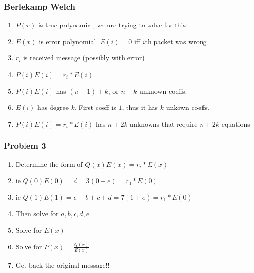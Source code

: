 \documentclass{beamer}
\begin{document}
\begin{frame}
  \frametitle{Berlekamp Welch}

    \begin{enumerate}[<+->]
      \item $P(x)$ is true polynomial, we are trying to solve for this
      \item $E(x)$ is error polynomial. $E(i) = 0$ iff $i$th packet was wrong
      \item $r_i$ is received message (possibly with error)
      \item $P(i)E(i) = r_i * E(i)$
      \item $P(i)E(i)$ has $(n - 1) + k$, or $n+k$ unknown coeffs. 
      \item $E(i)$ has degree $k$. First coeff is $1$, thus it has $k$ unkown coeffs.
      \item $P(i)E(i) = r_i * E(i)$ has $n + 2k$ unknowns that require $n+2k$ equations
    \end{enumerate}

\end{frame}


\begin{frame}
  \frametitle{Problem 3}

    \begin{enumerate}[<+->]
      \item Determine the form of $Q(x)E(x) = r_i * E(x)$
      \item ie $Q(0)E(0) = d = 3(0+e) = r_0 * E(0)$
      \item ie $Q(1)E(1) = a + b + c + d = 7(1+e) = r_1 * E(0)$
      \item Then solve for $a, b, c, d, e$
      \item Solve for $E(x)$
      \item Solve for $P(x) = \frac{Q(x)}{E(x)}$
      \item Get back the original message!!
    \end{enumerate}

\end{frame}
\end{document}
